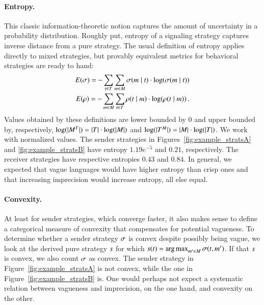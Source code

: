 \documentclass[fleqn,reqno,10pt]{article}
\begin{document}
\paragraph{Entropy.} This classic information-theoretic notion
captures the amount of uncertainty in a probability
distribution. Roughly put, entropy of a signaling strategy captures
inverse distance from a pure strategy. The usual definition of entropy
applies directly to mixed strategies, but provably equivalent metrics
for behavioral strategies are ready to hand:
\begin{align*}
  E(\sigma) = -\sum_{t \in T} \sum_{m \in M}
  \sigma(m \mid t) \cdot \log(\sigma(m \mid
  t)) \\
  E(\rho) = -\sum_{m \in M} \sum_{t \in T}
  \rho(t \mid m) \cdot \log(\rho(t \mid
  m)) \,. 
\end{align*}
Values obtained by these definitions are lower bounded by $0$ and
upper bounded by, respectively, $\log(|M^T|) = |T|
\cdot \log(|M|)$ and $\log(|T^M|) = |M| \cdot
\log(|T|)$. We work with normalized values. The sender
strategies in Figures~\ref{fig:example_stratsA} and
\ref{fig:example_stratsB} have entropy $1.19e^{-5}$ and $0.21$,
respectively. The receiver strategies have respective entropies $0.43$
and $0.84$. In general, we expected that vague languages would have
higher entropy than crisp ones and that increasing imprecision would
increase entropy, all else equal.

\paragraph{Convexity.} At least for sender strategies, which converge
faster, it also makes sense to define a categorical measure of
convexity that compensates for potential vagueness. To determine
whether a sender strategy $\sigma$ is convex despite possibly being
vague, we look at the derived pure strategy $s$ for which
$s(t) = \operatorname*{arg\,max}_{m' \in M}
\sigma(t,m')$. If that $s$ is convex, we also count
$\sigma$ as convex. The sender strategy in
Figure~\ref{fig:example_stratsA} is not convex, while the one in
Figure~\ref{fig:example_stratsB} is.  One would perhaps not expect a
systematic relation between vagueness and imprecision, on the one
hand, and convexity on the other.
\end{document}
